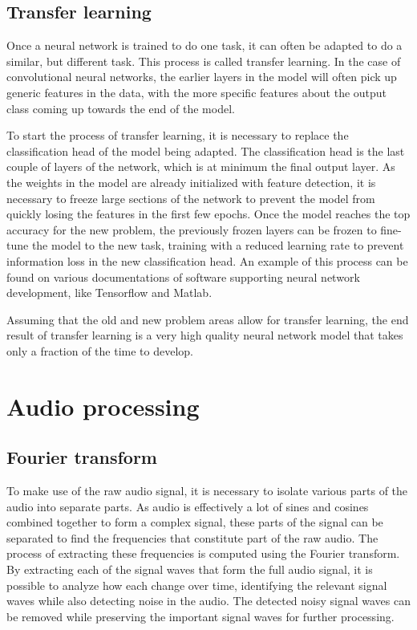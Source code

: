 \subsection{Transfer learning}
Once a neural network is trained to do one task, it can often be adapted to do a similar, but different task.
This process is called transfer learning\cite{wiki:transferlearning}.
In the case of convolutional neural networks, the earlier layers in the model will often pick up generic features in the data, with the more specific features about the output class coming up towards the end of the model.

To start the process of transfer learning, it is necessary to replace the classification head of the model being adapted.
The classification head is the last couple of layers of the network, which is at minimum the final output layer.
As the weights in the model are already initialized with feature detection, it is necessary to freeze large sections of the network to prevent the model from quickly losing the features in the first few epochs.
Once the model reaches the top accuracy for the new problem, the previously frozen layers can be frozen to fine-tune the model to the new task, training with a reduced learning rate to prevent information loss in the new classification head.
An example of this process can be found on various documentations of software supporting neural network development, like Tensorflow\cite{tensorflow:transferlearning} and Matlab\cite{MatlabPretrained}.


Assuming that the old and new problem areas allow for transfer learning, the end result of transfer learning is a very high quality neural network model that takes only a fraction of the time to develop.

\section{Audio processing}


\subsection{Fourier transform}
To make use of the raw audio signal, it is necessary to isolate various parts of the audio into separate parts.
As audio is effectively a lot of sines and cosines combined together to form a complex signal, these parts of the signal can be separated to find the frequencies that constitute part of the raw audio.
The process of extracting these frequencies is computed using the Fourier transform.
By extracting each of the signal waves that form the full audio signal, it is possible to analyze how each change over time, identifying the relevant signal waves while also detecting noise in the audio.
The detected noisy signal waves can be removed while preserving the important signal waves for further processing.


